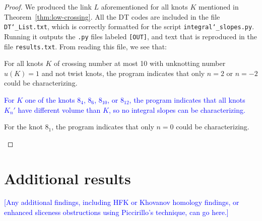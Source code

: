\documentclass[11pt,usenames,dvipsnames,reqno]{amsart}
\numberwithin{theorem}{section}
\theoremstyle{ex}
\theoremstyle{rem}
\def\kh#1{\textcolor{Blue}{#1}}
\begin{document}
\begin{proof} We produced the link $L$ aforementioned for all knots $K$ mentioned in Theorem~\ref{thm:low-crossing}. All the DT codes are included in the file \texttt{DT\char`_List.txt}, which is correctly formatted for the script \texttt{integral\char`_slopes.py}. Running it outputs the \texttt{.py} files labeled \texttt{[OUT]}, and text that is reproduced in the file \texttt{results.txt}. From reading this file, we see that:
	\begin{enumerate}[label=\normalfont \bf (\alph*)]
		\item For all knots $K$ of crossing number at most 10 with unknotting number $u(K) = 1$ and not twist knots, the program indicates that only $n = 2$ or $n = -2$ could be characterizing.
		\kh{\item For $K$ one of the knots $8_4$, $8_6$, $8_{10}$, or $8_{12}$, the program indicates that all knots $K_{n}'$ have different volume than $K$, so no integral slopes can be characterizing.}
		\item For the knot $8_1$, the program indicates that only $n = 0$ could be characterizing.
	\end{enumerate}
\end{proof}

\section{Additional results}

\kh{[Any additional findings, including HFK or Khovanov homology findings, or enhanced sliceness obstructions using Piccirillo's technique, can go here.]}




\end{document}
